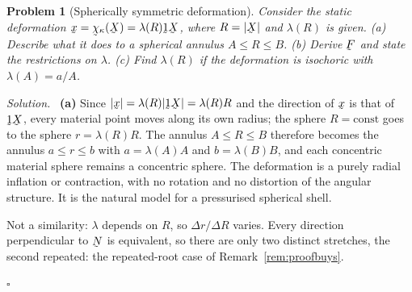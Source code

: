 \documentclass[17pt,a4paper]{extreport}
\DeclareRobustCommand{\vek}[1]{\underaccent{\tilde}{#1}}
\newcommand{\bx}{\vek{x}}
\newcommand{\bN}{\vek{N}}
\newcommand{\bX}{\vek{X}}
\newcommand{\bF}{\vek{F}}
\newcommand{\bchi}{\vek{\chi}}
\newcommand{\shift}{\vek{1}}
\theoremstyle{scplain}
\theoremstyle{scdefn}
\newtheorem{problem}{Problem}
\newenvironment{solution}{\par\smallskip\noindent\textit{Solution.}\ }
  {\hfill$\square$\par\smallskip}
\begin{document}
\begin{problem}[Spherically symmetric deformation]
Consider the static deformation $\bx=\bchi_{\kappa}(\bX)=\lambda(R)\shift
\bX$, where $R=|\bX|$ and $\lambda(R)$ is given.
(a) Describe what it does to a spherical annulus $A\le R\le B$.
(b) Derive $\bF$ and state the restrictions on $\lambda$.
(c) Find $\lambda(R)$ if the deformation is isochoric with
$\lambda(A)=a/A$.
\end{problem}

\begin{solution}
\textbf{(a)} Since $|\bx|=\lambda(R)|\shift\bX|=\lambda(R)R$ and the
direction of $\bx$ is that of $\shift\bX$, every material point moves
along its own radius; the sphere $R=\text{const}$ goes to the sphere
$r=\lambda(R)R$. The annulus $A\le R\le B$ therefore becomes the annulus
$a\le r\le b$ with $a=\lambda(A)A$ and $b=\lambda(B)B$, and each concentric
material sphere remains a concentric sphere. The deformation is a purely
radial inflation or contraction, with no rotation and no distortion of
the angular structure. It is the natural model for a pressurised spherical
shell.

Not a similarity: $\lambda$ depends on $R$, so $\Delta r/\Delta R$ varies.
Every direction perpendicular to $\bN$ is equivalent, so there are only
two distinct stretches, the second repeated: the repeated-root case of
Remark~\ref{rem:proofbuys}.


\end{solution}
\end{document}
